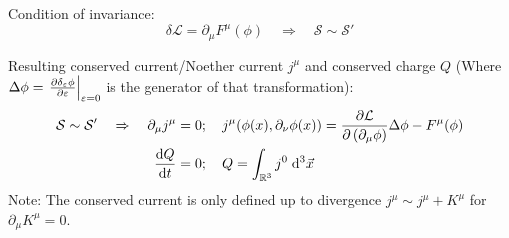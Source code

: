 		\noindent
		Condition of invariance:
		\begin{equation}
			\delta\mathcal{L} = \partial_\mu F^\mu(\phi)
			\quad \Rightarrow \quad \mathcal{S} \sim \mathcal{S}'
		\end{equation}

		\noindent
		Resulting conserved current/Noether current $j^{\mu}$ and conserved charge $Q$ (Where $\Delta \phi = \eval{\pdv{\delta_\varepsilon \phi}{\varepsilon}}_{\varepsilon=0}$ is the generator of that transformation):
		\begin{equation}
			\begin{aligned}
				\mathcal{S} \sim \mathcal{S}' \quad\Rightarrow\quad
				\partial_\mu j^\mu &= 0;\quad
				j^\mu \qty( \phi(x), \partial_\nu\phi(x) ) = \pdv{\mathcal{L}}{\left(\partial_\mu \phi\right)}\Delta\phi - F^\mu(\phi) \\
				\dv{Q}{t} &= 0; \quad Q = \int_{\mathbb{R}^3} j^0\;\dd^3\vec{x} \\
			\end{aligned}
		\end{equation}
		Note: The conserved current is only defined up to divergence $j^\mu \sim j^\mu + K^\mu$ for $\partial_\mu K^\mu = 0$.